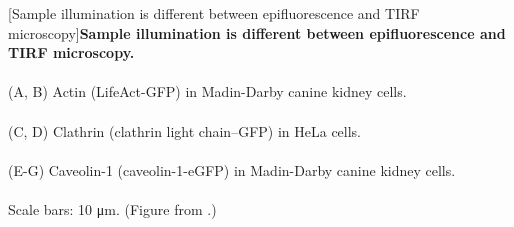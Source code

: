 \begin{centering}
\captionsetup{parbox=none}
[Sample illumination is different between epifluorescence and TIRF microscopy]{\textbf{Sample illumination is different between epifluorescence and TIRF microscopy.}
\\
\\
(A, B) Actin (LifeAct-GFP) in Madin-Darby canine kidney cells.
\\
\\
(C, D) Clathrin (clathrin light chain--GFP) in HeLa cells.
\\
\\
(E-G) Caveolin-1 (caveolin-1-eGFP) in Madin-Darby canine kidney cells.
\\
\\
Scale bars: 10 μm. (Figure from \autocite{Mattheyses_2010}.)}
\label{img:TIRF_comparison}
\end{centering}
 
